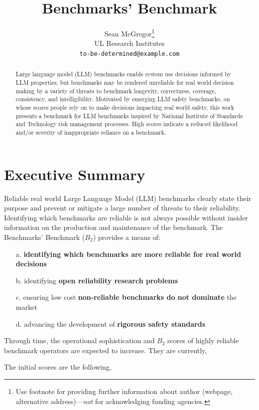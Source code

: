 \documentclass{article}
\title{Benchmarks' Benchmark}
\author{%
  Sean McGregor\thanks{Use footnote for providing further information
    about author (webpage, alternative address)---\emph{not} for acknowledging
    funding agencies.} \\
  UL Research Institutes\\
  \texttt{to-be-determined@example.com} \\
}
\begin{document}
\maketitle


\begin{abstract}
Large language model (LLM) benchmarks enable system use decisions informed by LLM properties, but benchmarks may be rendered unreliable for real world decision making by a variety of threats to benchmark longevity, correctness, coverage, consistency, and intelligibility. Motivated by emerging LLM safety benchmarks, on whose scores people rely on to make decisions impacting real world safety, this work presents a benchmark for LLM benchmarks inspired by National Institute of Standards and Technology risk management processes. High scores indicate a reduced likelihood and/or severity of inappropriate reliance on a benchmark.
\end{abstract}


\section{Executive Summary}

Reliable real world Large Language Model (LLM) benchmarks clearly state their purpose and prevent or mitigate a large number of threats to their reliability. Identifying which benchmarks are reliable is not always possible without insider information on the production and maintenance of the benchmark. The Benchmarks' Benchmark (\(B_{2}\)) provides a means of:

\begin{itemize}
    \item[a.] {\bf identifying which benchmarks are more reliable for real world decisions}
    \item[b.] identifying {\bf open reliability research problems}
    \item[c.] ensuring low cost {\bf non-reliable benchmarks do not dominate} the market
    \item[d.] advancing the development of {\bf rigorous safety standards}
\end{itemize}

Through time, the operational sophistication and \(B_2\) scores of highly reliable benchmark operators are expected to increase. They are currently,

The initial scores are the following,

\end{document}
